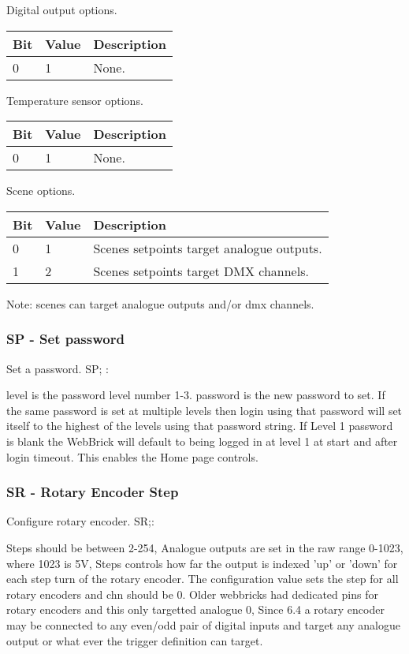 Digital output options.

\begin{tabular}{l|l|p{12cm}}
Bit&Value&Description\\
\hline
0&1&None.\\
\end{tabular}

Temperature sensor options.

\begin{tabular}{l|l|p{12cm}}
Bit&Value&Description\\
\hline
0&1&None.\\
\end{tabular}

Scene options.

\begin{tabular}{l|l|p{12cm}}
Bit&Value&Description\\
\hline
0&1&Scenes setpoints target analogue outputs.\\
1&2&Scenes setpoints target DMX channels.\\
\end{tabular}

Note: scenes can target analogue outputs and/or dmx channels.

\subsubsection{SP - Set password}
Set a password.
SP; :

level is the password level number 1-3. password is the new password to set. If the same password
is set at multiple levels then login using that password will set itself to the highest of the 
levels using that password string. If Level 1 password is blank the WebBrick will default to being
logged in at level 1 at start and after login timeout. This enables the Home page controls.

\subsubsection{SR - Rotary Encoder Step}
Configure rotary encoder.
SR;:

Steps should be between 2-254, Analogue outputs are set in the raw range 0-1023, where 1023 is 5V, 
Steps controls how far the output is
indexed 'up' or 'down' for each step turn of the rotary encoder. 
The configuration value sets the step for all rotary encoders and chn should be 0. Older webbricks had dedicated pins
for rotary encoders and this only targetted analogue 0, Since 6.4 a rotary encoder may be connected to any even/odd pair of digital 
inputs and target any analogue output or what ever the trigger definition can target.


